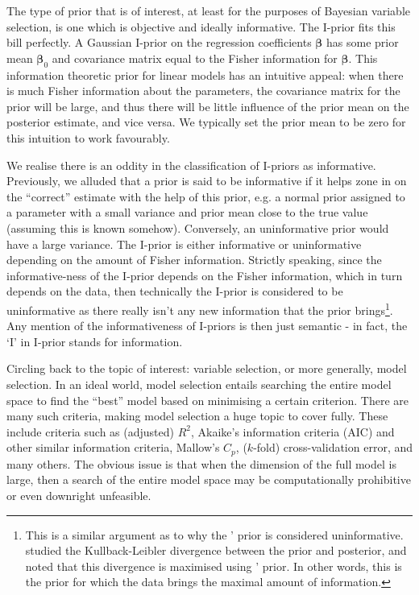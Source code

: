 
The type of prior that is of interest, at least for the purposes of Bayesian variable selection, is one which is objective and ideally informative. The I-prior fits this bill perfectly. A Gaussian I-prior on the regression coefficients $\boldsymbol\beta$ has some prior mean $\boldsymbol\beta_0$ and covariance matrix equal to the Fisher information for $\boldsymbol\beta$. This information theoretic prior for linear models has an intuitive appeal: when there is much Fisher information about the parameters, the covariance matrix for the prior will be large, and thus there will be little influence of the prior mean on the posterior estimate, and vice versa. We typically set the prior mean to be zero for this intuition to work favourably.

We realise there is an oddity in the classification of I-priors as informative. Previously, we alluded that a prior is said to be informative if it helps zone in on the ``correct'' estimate with the help of this prior, e.g. a normal prior assigned to a parameter with a small variance and prior mean close to the true value (assuming this is known somehow). Conversely, an uninformative prior would have a large variance. The I-prior is either informative or uninformative depending on the amount of Fisher information. Strictly speaking, since the informative-ness of the I-prior depends on the Fisher information, which in turn depends on the data, then technically the I-prior is considered to be uninformative as there really isn't any new information that the prior brings\footnote{This is a similar argument as to why the \citeauthor{Jeffreys1946}' prior is considered uninformative. \citet*{Liu2014} studied the Kullback-Leibler divergence between the prior and posterior, and noted that this divergence is maximised using \citeauthor{Jeffreys1946}' prior. In other words, this is the prior for which the data brings the maximal amount of information.}. Any mention of the informativeness of I-priors is then just semantic - in fact, the `I' in I-prior stands for information. 

Circling back to the topic of interest: variable selection, or more generally, model selection. In an ideal world, model selection entails searching the entire model space to find the ``best'' model based on minimising a certain criterion. There are many such criteria, making model selection a huge topic to cover fully. These include criteria such as (adjusted) $R^2$, Akaike's information criteria (AIC) and other similar information criteria, Mallow's $C_p$, ($k$-fold) cross-validation error, and many others. The obvious issue is that when the dimension of the full model is large, then a search of the entire model space may be computationally prohibitive or even downright unfeasible. 

